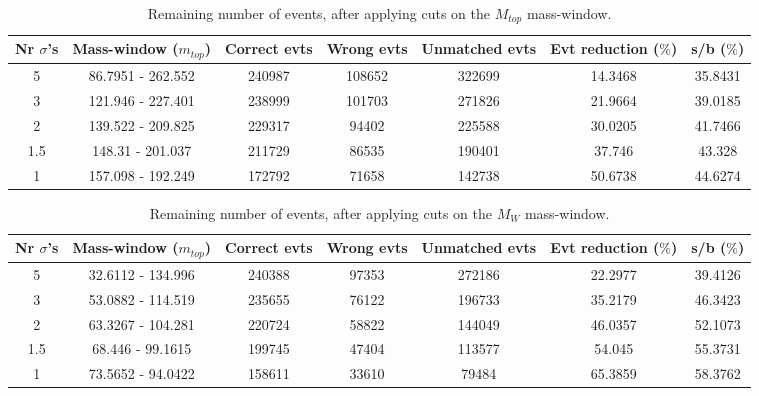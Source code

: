 \documentclass{article}
\begin{document}
 \begin{table}[h!t] 
  \caption{Remaining number of events, after applying cuts on the $M_{top}$ mass-window.} 
  \centering 
   \begin{tabular}{c|c|c|c|c|c|c} 
     Nr $\sigma$'s & Mass-window ($m_{top}$)    & Correct evts    & Wrong evts     & Unmatched evts   & Evt reduction ($\%$)    & s/b ($\%$)     \\ 
     \hline
     5 & 86.7951 - 262.552  &   240987  &  108652  &  322699  &  14.3468 &  35.8431 \\ 
     3 & 121.946 - 227.401  &   238999  &  101703  &  271826  &  21.9664 &  39.0185 \\ 
     2 & 139.522 - 209.825  &   229317  &  94402  &  225588  &  30.0205 &  41.7466 \\ 
     1.5 & 148.31 - 201.037  &   211729  &  86535  &  190401  &  37.746 &  43.328 \\ 
     1 & 157.098 - 192.249  &   172792  &  71658  &  142738  &  50.6738 &  44.6274
   \end{tabular} 
 \end{table} 
 
 \begin{table}[h!t] 
  \caption{Remaining number of events, after applying cuts on the $M_{W}$ mass-window.} 
  \centering 
   \begin{tabular}{c|c|c|c|c|c|c} 
     Nr $\sigma$'s & Mass-window ($m_{top}$)    & Correct evts    & Wrong evts     & Unmatched evts   & Evt reduction ($\%$)    & s/b ($\%$)     \\ 
     \hline
     5 & 32.6112 - 134.996  &   240388  &  97353  &  272186  &  22.2977 &  39.4126 \\ 
     3 & 53.0882 - 114.519  &   235655  &  76122  &  196733  &  35.2179 &  46.3423 \\ 
     2 & 63.3267 - 104.281  &   220724  &  58822  &  144049  &  46.0357 &  52.1073 \\ 
     1.5 & 68.446 - 99.1615  &   199745  &  47404  &  113577  &  54.045 &  55.3731 \\ 
     1 & 73.5652 - 94.0422  &   158611  &  33610  &  79484  &  65.3859 &  58.3762
   \end{tabular} 
 \end{table} 
 
\end{document}
